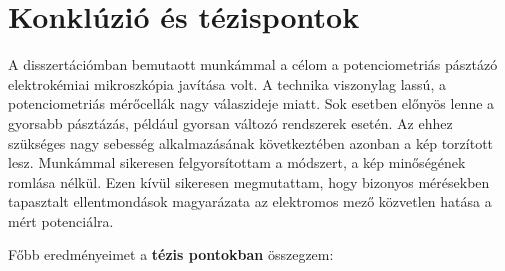 \section{Konklúzió és tézispontok}
A disszertációmban bemutaott munkámmal a célom a potenciometriás pásztázó elektrokémiai mikroszkópia javítása volt.
A technika viszonylag lassú, a potenciometriás mérőcellák nagy válaszideje miatt.
Sok esetben előnyös lenne a gyorsabb pásztázás, például gyorsan változó rendszerek esetén.
Az ehhez szükséges nagy sebesség alkalmazásának következtében azonban a kép torzított lesz.
Munkámmal sikeresen felgyorsítottam a módszert, a kép minőségének romlása nélkül.
Ezen kívül sikeresen megmutattam, hogy bizonyos mérésekben tapasztalt ellentmondások magyarázata az elektromos mező közvetlen hatása a mért potenciálra.

Főbb eredményeimet a \textbf{tézis pontokban} összegzem:

